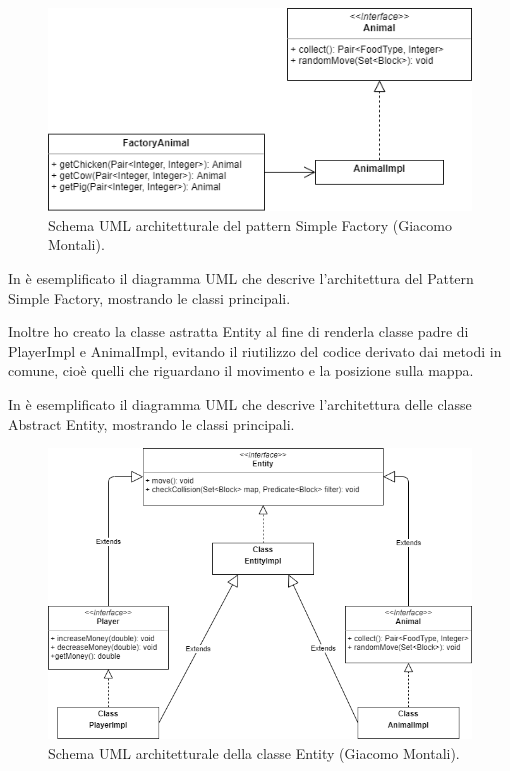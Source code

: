 \documentclass[a4paper,12pt]{report}
\begin{document}
\begin{figure}[!htb]
	\centering{}
	\includegraphics[width=\textwidth]{img/UML_FactoryMonta.png}
	\caption{Schema UML architetturale del pattern Simple Factory (Giacomo Montali).}
	\label{img:GiacomoMontali_Factory}
\end{figure}

In  è esemplificato il diagramma UML che descrive l'architettura del Pattern Simple Factory, mostrando le classi principali.

Inoltre ho creato la classe astratta Entity al fine di renderla classe padre di PlayerImpl e AnimalImpl, evitando il riutilizzo del codice derivato dai metodi in comune, cioè quelli che riguardano il movimento e la posizione sulla mappa.

In  è esemplificato il diagramma UML che descrive l'architettura delle classe Abstract Entity, mostrando le classi principali.

\hfill\break
\begin{figure}[!htb]
	\centering{}
	\includegraphics[width=\textwidth]{img/UML_AbstractMonta.png}
	\caption{Schema UML architetturale della classe Entity (Giacomo Montali).}
	\label{img:GiacomoMontali_Abstract}
\end{figure}
\end{document}
